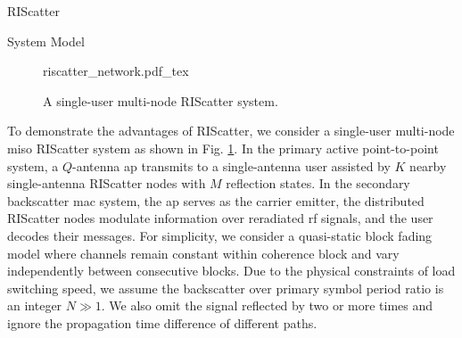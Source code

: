 \documentclass[journal]{IEEEtran}
\begin{document}
\begin{section}{RIScatter}
	\begin{subsection}{System Model}
		\begin{figure}[!t]
			\centering
			\def\svgwidth{0.8\columnwidth}
			\footnotesize{
				{riscatter_network.pdf_tex}
			}
			\caption{A single-user multi-node RIScatter system.}
			\label{fi:riscatter_network}
		\end{figure}
		To demonstrate the advantages of RIScatter, we consider a single-user multi-node \gls{miso} RIScatter system as shown in Fig. \ref{fi:riscatter_network}.
		In the primary active point-to-point system, a $Q$-antenna \gls{ap} transmits to a single-antenna user assisted by $K$ nearby single-antenna RIScatter nodes with $M$ reflection states.
		In the secondary backscatter \gls{mac} system, the \gls{ap} serves as the carrier emitter, the distributed RIScatter nodes modulate information over reradiated \gls{rf} signals, and the user decodes their messages.
		For simplicity, we consider a quasi-static block fading model where channels remain constant within coherence block and vary independently between consecutive blocks.
		Due to the physical constraints of load switching speed, we assume the backscatter over primary symbol period ratio is an integer $N \gg 1$.
		We also omit the signal reflected by two or more times and ignore the propagation time difference of different paths.


\end{subsection}
\end{section}
\end{document}
